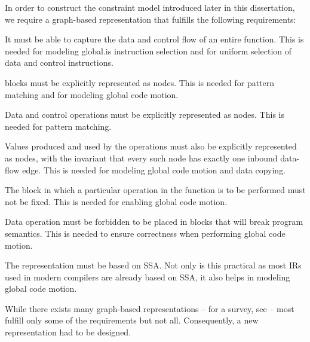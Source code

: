 In order to construct the \gls{constraint model} introduced later in this
dissertation, we require a \gls{graph}-based representation that fulfills the
following requirements:
%
\begin{requirements}
  \item {}
    It must be able to capture the data and control flow of an entire
    \gls{function}.
    This is needed for modeling \gls{global.is} \gls{instruction selection}
    and for uniform selection of data and control \glspl{instruction}.
  \item {}
    \Glspl{block} must be explicitly represented as \glspl{node}.
    This is needed for \gls{pattern matching} and for modeling \gls{global code
      motion}.
  \item {}
    Data and control \glspl{operation} must be explicitly represented as
    \glspl{node}.
    This is needed for \gls{pattern matching}.
  \item {}
    Values produced and used by the \glspl{operation} must also be explicitly
    represented as \glspl{node}, with the invariant that every such \gls{node}
    has exactly one inbound data-flow \gls{edge}.
    This is needed for modeling \gls{global code motion} and \gls{data copying}.
  \item {}
    The \gls{block} in which a particular \gls{operation} in the \gls{function}
    is to be performed must not be fixed.
    This is needed for enabling \gls{global code motion}.
  \item {}
    Data \gls{operation} must be forbidden to be placed in \glspl{block} that
    will break \gls{program} semantics.
    This is needed to ensure correctness when performing \gls{global code
      motion}.
  \item {}
    The representation must be based on \gls{SSA}.
    Not only is this practical as most \glspl{IR} used in modern
    \glspl{compiler} are already based on \gls{SSA}, it also helps in modeling
    \gls{global code motion}.
\end{requirements}

While there exists many \gls{graph}-based representations -- for a survey, see
\cite{StanierWatson:2013} -- most fulfill only some of the requirements but not
all.
%
Consequently, a new representation had to be designed.



